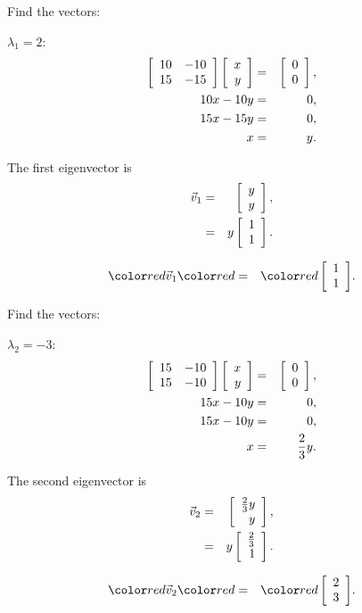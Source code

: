 \begin{frame}
  Find the vectors:

  $\lambda_1 = 2$:
  \begin{eqnarray*}
    \left[ \begin{array}{rr} 10 & -10 \\ 15 & -15 \end{array} \right] \left[ \begin{array}{r} x \\ y \end{array} \right] & = & \left[ \begin{array}{r} 0 \\ 0 \end{array} \right], \\
    10x - 10y & = & 0, \\
    15x - 15y & = & 0, \\
    x & = & y.
  \end{eqnarray*}

  The first eigenvector is 
  \begin{eqnarray*}
    \vec{v}_1 & = & \left[ \begin{array}{r} y \\ y \end{array} \right], \\
    & = & y \left[ \begin{array}{r} 1 \\ 1 \end{array} \right].
  \end{eqnarray*}

  \begin{eqnarray*}
    \redText{\vec{v}_1} & \redText{=} & \redText{\vecTwo{1}{1}}.
  \end{eqnarray*}

\end{frame}

\begin{frame}
  Find the vectors:

  $\lambda_2 = -3$:
  \begin{eqnarray*}
    \left[ \begin{array}{rr} 15 & -10 \\ 15 & -10 \end{array} \right] \left[ \begin{array}{r} x \\ y \end{array} \right] & = & \left[ \begin{array}{r} 0 \\ 0 \end{array} \right], \\
    15x - 10y & = & 0, \\
    15x - 10y & = & 0, \\
    x & = & \frac{2}{3} y.
  \end{eqnarray*}

  The second eigenvector is 
  \begin{eqnarray*}
    \vec{v}_2 & = & \left[ \begin{array}{r} \frac{2}{3}y \\ y \end{array} \right], \\
    & = & y \left[ \begin{array}{r} \frac{2}{3} \\ 1 \end{array} \right].
  \end{eqnarray*}

  \begin{eqnarray*}
    \redText{\vec{v}_2} & \redText{=} & \redText{\vecTwo{2}{3}}.
  \end{eqnarray*}

\end{frame}






